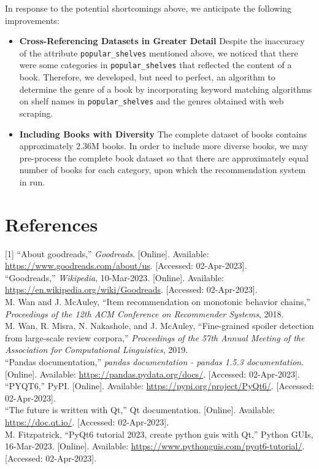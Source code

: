 \documentclass[fontsize=11pt]{article}
\begin{document}
In response to the potential shortcomings above, we anticipate the following improvements:
\begin{itemize}
    \item \textbf{Cross-Referencing Datasets in Greater Detail}  Despite the inaccuracy of the attribute \texttt{popular\_shelves} mentioned above, we noticed that there were some categories in \texttt{popular\_shelves} that reflected the content of a book. Therefore, we developed, but need to perfect, an algorithm to determine the genre of a book by incorporating keyword matching algorithms on shelf names in \texttt{popular\_shelves} and the genres obtained with web scraping.
    \item \textbf{Including Books with Diversity} The complete dataset of books contains approximately 2.36M books. In order to include more diverse books, we may pre-process the complete book dataset so that there are approximately equal number of books for each category, upon which the recommendation system in run.
\end{itemize}

\section*{References}
[1] “About goodreads,” \textit{Goodreads}. [Online]. Available: \url{https://www.goodreads.com/about/us}. [Accessed: 02-Apr-2023]. \\

\noindent [2] “Goodreads,” \textit{Wikipedia}, 10-Mar-2023. [Online]. Available: \url{https://en.wikipedia.org/wiki/Goodreads}. [Accessed: 02-Apr-2023].  \\

\noindent [3] M. Wan and J. McAuley, “Item recommendation on monotonic behavior chains,” \textit{Proceedings of the 12th ACM Conference on Recommender Systems}, 2018. \\

\noindent [4] M. Wan, R. Misra, N. Nakashole, and J. McAuley, “Fine-grained spoiler detection from large-scale review corpora,” \textit{Proceedings of the 57th Annual Meeting of the Association for Computational Linguistics}, 2019. \\


\noindent [5] “Pandas documentation,” \textit{pandas documentation - pandas 1.5.3 documentation}. [Online]. Available: \url{https://pandas.pydata.org/docs/}. [Accessed: 02-Apr-2023]. \\

\noindent [6] “PYQT6,” PyPI. [Online]. Available: \url{https://pypi.org/project/PyQt6/}. [Accessed: 02-Apr-2023].  \\

\noindent [7] “The future is written with Qt,” Qt documentation. [Online]. Available: \url{https://doc.qt.io/}. [Accessed: 02-Apr-2023]. \\

\noindent [8] M. Fitzpatrick, “PyQt6 tutorial 2023, create python guis with Qt,” Python GUIs, 16-Mar-2023. [Online]. Available: \url{https://www.pythonguis.com/pyqt6-tutorial/}. [Accessed: 02-Apr-2023].
\end{document}
